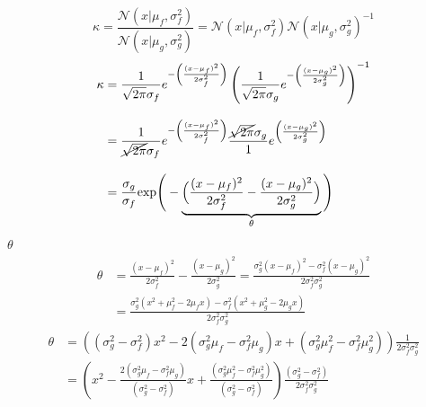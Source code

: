 \documentclass[a4paper,11pt]{book}
\newcommand{\N}{\mathcal{N}}
\theoremstyle{definition}
\newif\ifen
\newif\ifes
\newcommand{\en}[1]{\ifen#1\fi}
\newcommand{\es}[1]{\ifes#1\fi}
\begin{document}
\begin{equation}
\kappa = \frac{\N(x|\mu_f,\sigma_f^2)}{\N(x|\mu_g,\sigma_g^2)} = \N(x|\mu_f,\sigma_f^2)\N(x|\mu_g,\sigma_g^2)^{-1}
\end{equation}
%
\en{By definition}
\begin{equation}
\begin{split}
\kappa & = \frac{1}{\sqrt{2\pi}\sigma_f}e^{-\left(\frac{(x-\mu_f)^2}{2\sigma_f^2}\right)} \left( \frac{1}{\sqrt{2\pi}\sigma_g}e^{-\left(\frac{(x-\mu_g)^2}{2\sigma_g^2}\right)} \right)^{-1} \\[0.3cm]
& = \frac{1}{\cancel{\sqrt{2\pi}}\sigma_f}e^{-\left(\frac{(x-\mu_f)^2}{2\sigma_f^2}\right)} \frac{\cancel{\sqrt{2\pi}}\sigma_g}{1} e^{\left(\frac{(x-\mu_g)^2}{2\sigma_g^2}\right)} \\[0.3cm]
& = \frac{\sigma_g}{\sigma_f}\text{exp}\Bigg(-\underbrace{\Big(\frac{(x-\mu_f)^2}{2\sigma_f^2} - \frac{(x-\mu_g)^2}{2\sigma_g^2}\Big)}_{\theta}\Bigg)
\end{split}
\end{equation}
%
\en{Reorganizing} $\theta$
\begin{equation}
\begin{split}
 \theta & = \frac{(x-\mu_f)^2}{2\sigma_f^2} - \frac{(x-\mu_g)^2}{2\sigma_g^2} = \frac{\sigma_g^2(x-\mu_f)^2 - \sigma_f^2(x-\mu_g)^2}{2\sigma_f^2\sigma_g^2} \\[0.3cm]
 & = \frac{\sigma_g^2(x^2+\mu_f^2-2\mu_fx) - \sigma_f^2(x^2+\mu_g^2-2\mu_gx)}{2\sigma_f^2\sigma_g^2}
\end{split}
\end{equation}
%
\en{We expand and sort terms based on $x$,}
%
\begin{equation}
\begin{split}
 \theta & = \left((\sigma_g^2 - \sigma_f^2)x^2 - 2(\sigma_g^2\mu_f - \sigma_f^2\mu_g)x + (\sigma_g^2\mu_f^2 - \sigma_f^2\mu_g^2 )\right) \frac{1}{2\sigma_f^2\sigma_g^2} \\[0.3cm]
 & = \left(x^2 - \frac{2(\sigma_g^2\mu_f - \sigma_f^2\mu_g)}{(\sigma_g^2 - \sigma_f^2)}x + \frac{(\sigma_g^2\mu_f^2 - \sigma_f^2\mu_g^2 )}{(\sigma_g^2 - \sigma_f^2)}\right) \frac{(\sigma_g^2 - \sigma_f^2)}{2\sigma_f^2\sigma_g^2}
\end{split}
\end{equation}
%
\en{This is quadratic in $x$. Since a term $\varepsilon=0$ independent of $x$ can be added to complete the square in $\theta$, this test is sufficient to determine the mean and variance when it is not necessary to normalize. }%
\end{document}
